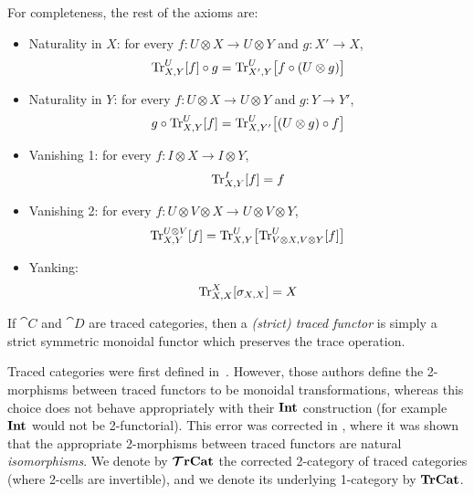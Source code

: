 \documentclass[11pt,oneside,article]{memoir}
\begin{document}
For completeness, the rest of the axioms are:
\begin{itemize}
   \item Naturality in $X$: for every $f\colon U\otimes X\to U\otimes Y$ and $g\colon X'\to X$,
      \begin{equation*}
         \operatorname{Tr}^U_{X,Y}[f]\circ g = \operatorname{Tr}^U_{X',Y}\bigl[f\circ(U\otimes g)\bigr]
      \end{equation*}
   \item Naturality in $Y$: for every $f\colon U\otimes X\to U\otimes Y$ and $g\colon Y\to Y'$,
      \begin{equation*}
         g\circ\operatorname{Tr}^U_{X,Y}[f] = \operatorname{Tr}^U_{X,Y'}\bigl[(U\otimes g)\circ f\bigr]
      \end{equation*}
   \item Vanishing 1: for every $f\colon I\otimes X\to I\otimes Y$,
      \begin{equation*}
         \operatorname{Tr}^I_{X,Y}[f] = f
      \end{equation*}
   \item Vanishing 2: for every $f\colon U\otimes V\otimes X\to U\otimes V\otimes Y$,
      \begin{equation*}
         \operatorname{Tr}^{U\otimes V}_{X,Y}[f] = \operatorname{Tr}^U_{X,Y}\bigl[\operatorname{Tr}^U_{V\otimes X,V\otimes Y}[f]\bigr]
      \end{equation*}
   \item Yanking:
      \begin{equation*}
         \operatorname{Tr}^X_{X,X}[\sigma_{X,X}]=X
      \end{equation*}
\end{itemize}

If $\cat{C}$ and $\cat{D}$ are traced categories, then a \emph{(strict) traced functor} is simply a
strict symmetric monoidal functor which preserves the trace operation.

\begin{remark}
      \label{rem:traced_2morphisms}
   Traced categories were first defined in~\cite{JoyalStreetVerity}. However, those authors define
   the 2-morphisms between traced functors to be monoidal transformations, whereas this choice does
   not behave appropriately with their $\mathbf{Int}$ construction (for example $\mathbf{Int}$ would not be
   2-functorial). This error was corrected in \cite{HK}, where it was shown that the appropriate
   2-morphisms between traced functors are natural \emph{isomorphisms}. We denote by $\bm{\mathcal{T}}\mathbf{rCat}$ the
   corrected 2-category of traced categories (where 2-cells are invertible), and we denote its
   underlying 1-category by $\mathbf{TrCat}$.
\end{remark}
\end{document}
